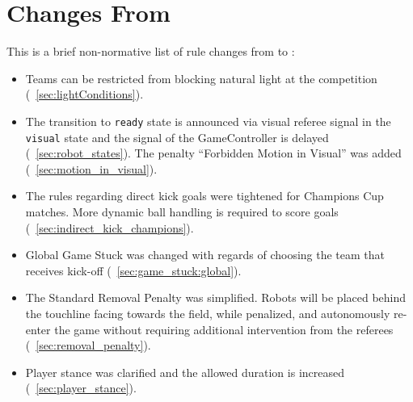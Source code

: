 \section{Changes From \LastRCYear}

This is a brief non-normative list of rule changes from \LastRCYear to \RCYear:
\begin{itemize}
  \item Teams can be restricted from blocking natural light at the competition (\cf~\cref{sec:lightConditions}).
  \item The transition to \texttt{ready} state is announced via visual referee signal in the \texttt{visual} state and the signal of the GameController is delayed (\cf~\cref{sec:robot_states}). The penalty ``Forbidden Motion in Visual'' was added (\cf~\cref{sec:motion_in_visual}).
  \item The rules regarding direct kick goals were tightened for Champions Cup matches. More dynamic ball handling is required to score goals (\cf~\cref{sec:indirect_kick_champions}).
  \item Global Game Stuck was changed with regards of choosing the team that receives kick-off (\cf~\cref{sec:game_stuck:global}).
  \item The Standard Removal Penalty was simplified. Robots will be placed behind the touchline facing towards the field, while penalized, and autonomously re-enter the game without requiring additional intervention from the referees (\cf~\cref{sec:removal_penalty}).
  \item Player stance was clarified and the allowed duration is increased (\cf~\cref{sec:player_stance}).
\end{itemize}
